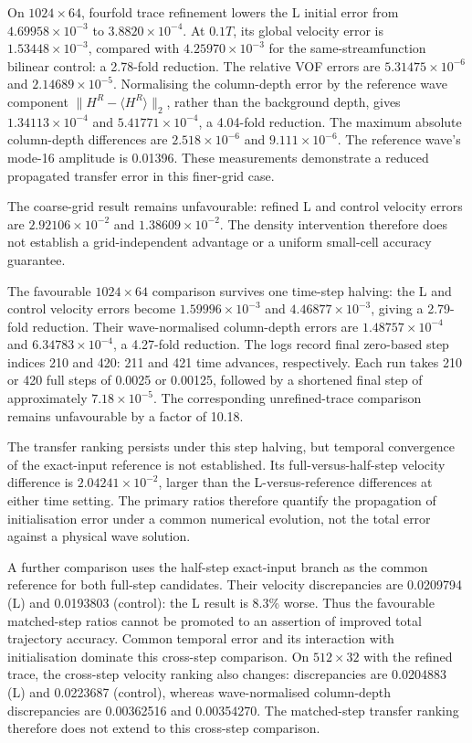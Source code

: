 \documentclass[10pt]{article}
\begin{document}
On $1024\times64$, fourfold trace refinement lowers the L initial
error from $4.69958\times10^{-3}$ to $3.8820\times10^{-4}$.
At $0.1T$, its global velocity error is $1.53448\times10^{-3}$, compared
with $4.25970\times10^{-3}$ for the same-streamfunction bilinear control:
a 2.78-fold reduction. The relative VOF errors are $5.31475\times10^{-6}$
and $2.14689\times10^{-5}$. Normalising the column-depth error by the
reference wave component $\|H^R-\langle H^R\rangle\|_2$, rather than the
background depth, gives $1.34113\times10^{-4}$ and $5.41771\times10^{-4}$,
a 4.04-fold reduction. The maximum absolute column-depth differences are
$2.518\times10^{-6}$ and $9.111\times10^{-6}$. The reference wave's mode-16
amplitude is 0.01396. These measurements demonstrate a reduced propagated
transfer error in this finer-grid case.

The coarse-grid result remains unfavourable: refined L and control
velocity errors are $2.92106\times10^{-2}$ and $1.38609\times10^{-2}$.
The density intervention therefore does not establish a grid-independent
advantage or a uniform small-cell accuracy guarantee.

The favourable $1024\times64$ comparison survives one time-step halving:
the L and control velocity errors become $1.59996\times10^{-3}$ and
$4.46877\times10^{-3}$, giving a 2.79-fold reduction. Their wave-normalised
column-depth errors are $1.48757\times10^{-4}$ and $6.34783\times10^{-4}$,
a 4.27-fold reduction. The logs record final zero-based step indices
210 and 420: 211 and 421 time advances, respectively. Each run takes
210 or 420 full steps of 0.0025 or 0.00125, followed by a shortened
final step of approximately $7.18\times10^{-5}$. The corresponding unrefined-trace
comparison remains unfavourable by a factor of 10.18.

The transfer ranking persists under this step halving, but temporal
convergence of the exact-input reference is not established. Its full-versus-half-step velocity
difference is $2.04241\times10^{-2}$, larger than the L-versus-reference
differences at either time setting. The primary ratios therefore quantify
the propagation of initialisation error under a common numerical evolution,
not the total error against a physical wave solution.

A further comparison uses the half-step exact-input branch as the common
reference for both full-step candidates. Their velocity discrepancies are
0.0209794 (L) and 0.0193803 (control): the L result is 8.3\% worse.
Thus the favourable matched-step ratios cannot be promoted to an assertion
of improved total trajectory accuracy. Common temporal error and its
interaction with initialisation dominate this cross-step comparison.
On $512\times32$ with the refined trace, the cross-step velocity ranking
also changes: discrepancies are 0.0204883 (L) and 0.0223687 (control),
whereas wave-normalised column-depth discrepancies are 0.00362516 and
0.00354270. The matched-step transfer ranking therefore does not extend
to this cross-step comparison.
\end{document}
